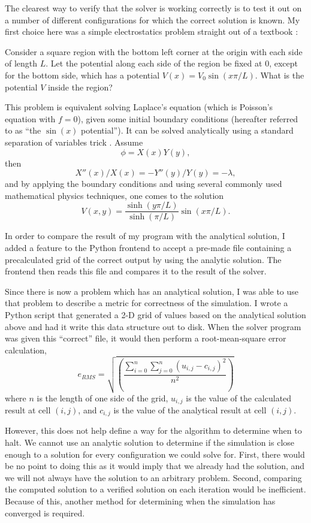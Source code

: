 The clearest way to verify that the solver is working correctly is to test it out on a number of different configurations
for which the correct solution is known. My first choice here was a simple electrostatics problem straight out of a textbook \cite{griffiths}:
\begin{addmargin}[2em]{2em}%
	Consider a square region with the bottom left corner at the origin with each side of length $L$. Let the potential
	along each side of the region be fixed at 0, except for the bottom side, which has a potential $V(x) = V_0 \sin(x \pi / L)$.
	What is the potential $V$ inside the region?
\end{addmargin}
This problem is equivalent solving Laplace's equation (which is Poisson's equation with $f=0$), given some initial boundary conditions (hereafter referred to as ``the $\sin(x)$ potential'').
It can be solved analytically using a standard separation of variables trick \cite{boas}. Assume
$$\phi = X(x) Y(y),$$
then
$$X''(x)/X(x) = -Y''(y)/Y(y) = -\lambda,$$
and by applying the boundary conditions and using several commonly used mathematical physics techniques, one comes to the solution\cite{griffiths}
$$V(x,y) = \frac{\sinh(y \pi / L)}{\sinh(\pi / L)} \sin(x \pi / L).$$

In order to compare the result of my program with the analytical solution, I added a feature to the Python frontend
to accept a pre-made file containing a precalculated grid of the correct output by using the analytic solution. The
frontend then reads this file and compares it to the result of the solver.

Since there is now a problem which has an analytical solution, I was able to use that problem to describe a metric for
correctness of the simulation. I wrote a Python script that generated a 2-D grid of values based on the analytical
solution above and had it write this data structure out to disk. When the solver program was given this ``correct''
file, it would then perform a root-mean-square error calculation,
$$e_{RMS} = \sqrt{\left(\frac{\sum_{i=0}^{n} \sum_{j=0}^{n} (u_{i,j} - c_{i,j})^2}{n^2}\right)}$$
where $n$ is the length of one side of the grid, $u_{i,j}$ is the value of the calculated result at cell $(i,j)$, and
$c_{i, j}$ is the value of the analytical result at cell $(i, j)$.



However, this does not help define a way for the algorithm to determine when to halt. We cannot use an analytic solution
to determine if the simulation is close enough to a solution for every configuration we could solve for. First, there
would be no point to doing this as it would imply that we already had the solution, and we will not always have the
solution to an arbitrary problem. Second, comparing the computed solution to a verified solution on each iteration would
be inefficient. Because of this, another method for determining when the simulation has converged is required.

